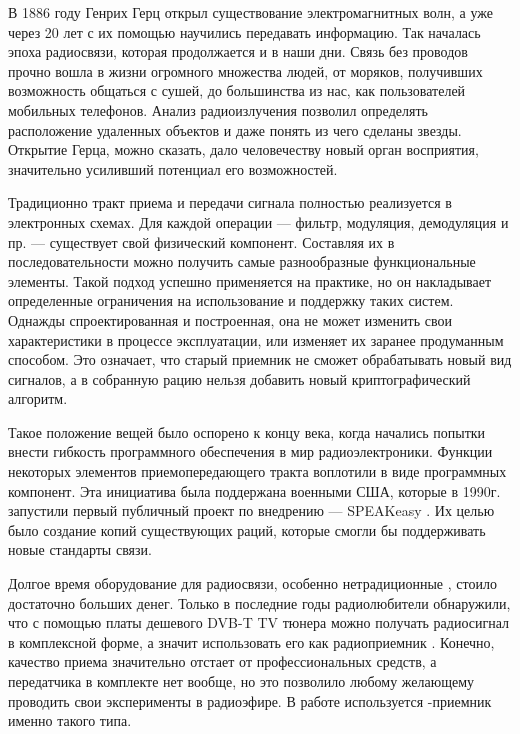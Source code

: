 \label{sec:intro}

В 1886 году Генрих Герц открыл существование электромагнитных волн, а уже через 20 лет с их помощью научились передавать информацию. Так началась эпоха радиосвязи, которая продолжается и в наши дни. Связь без проводов прочно вошла в жизни огромного множества людей, от моряков, получивших возможность общаться с сушей, до большинства из нас, как пользователей мобильных телефонов. Анализ радиоизлучения позволил определять расположение удаленных объектов и даже понять из чего сделаны звезды. Открытие Герца, можно сказать, дало человечеству новый орган восприятия, значительно усиливший потенциал его возможностей.

Традиционно тракт приема и передачи сигнала полностью реализуется в электронных схемах. Для каждой операции --- фильтр, модуляция, демодуляция и пр. --- существует свой физический компонент. Составляя их в последовательности можно получить самые разнообразные функциональные элементы. Такой подход успешно применяется на практике, но он накладывает определенные ограничения на использование и поддержку таких систем. Однажды спроектированная и построенная, она не может изменить свои характеристики в процессе эксплуатации, или изменяет их заранее продуманным способом. Это означает, что старый приемник не сможет обрабатывать новый вид сигналов, а в собранную рацию нельзя добавить новый криптографический алгоритм.

Такое положение вещей было оспорено к концу  века, когда начались попытки внести гибкость программного обеспечения в мир радиоэлектроники. Функции некоторых элементов приемопередающего тракта воплотили в виде программных компонент. Эта инициатива была поддержана военными США, которые в 1990г. запустили первый публичный проект по внедрению \SDR --- SPEAKeasy \cite{speakeasy_wiki}. Их целью было создание копий существующих раций, которые смогли бы поддерживать новые стандарты связи.

Долгое время оборудование для радиосвязи, особенно нетрадиционные \SDR, стоило достаточно больших денег. Только в последние годы радиолюбители обнаружили, что с помощью платы дешевого DVB-T TV тюнера можно получать радиосигнал в комплексной форме, а значит использовать его как радиоприемник \cite{rtl_sdr_about}. Конечно, качество приема значительно отстает от профессиональных средств, а передатчика в комплекте нет вообще, но это позволило любому желающему проводить свои эксперименты в радиоэфире. В работе используется \SDR-приемник именно такого типа.

